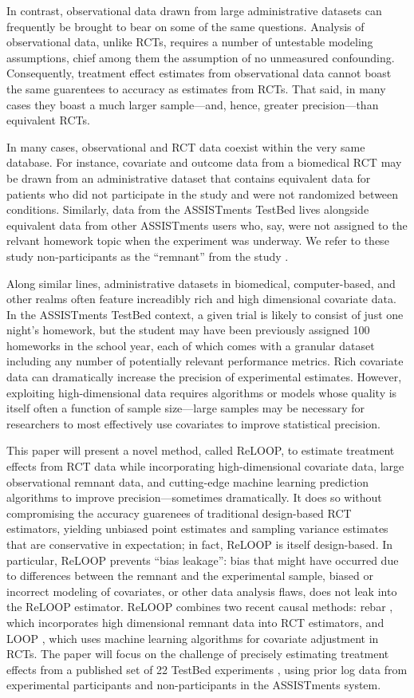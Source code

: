 In contrast, observational data drawn from large administrative
datasets can frequently be brought to bear on some of the same
questions.
Analysis of observational data, unlike RCTs, requires a number of
untestable modeling assumptions, chief among them the assumption of no
unmeasured confounding.
Consequently, treatment effect estimates from observational data
cannot boast the same guarentees to accuracy as estimates from RCTs.
That said, in many cases they boast a much larger sample---and, hence,
greater precision---than equivalent RCTs.

In many cases, observational and RCT data coexist within the very same
database.
For instance, covariate and outcome data from a biomedical RCT may be
drawn from an administrative dataset that contains equivalent data for
patients who did not participate in the study and were not randomized
between conditions.
Similarly, data from the ASSISTments TestBed lives alongside
equivalent data from other ASSISTments users who, say, were not
assigned to the relvant homework topic when the experiment was
underway.
We refer to these study non-participants as the ``remnant'' from the
study \citep[c.f.][]{rebarPaper}.

Along similar lines, administrative datasets in biomedical,
computer-based, and other realms often feature increadibly rich and
high dimensional covariate data.
In the ASSISTments TestBed context, a given
trial is likely to consist of just one night’s homework, but the
student may have been previously assigned 100 homeworks in the school
year, each of which comes with a granular dataset including any number
of potentially relevant performance metrics.
Rich covariate data can dramatically increase the precision of
experimental estimates.
However, exploiting high-dimensional data requires algorithms or
models whose quality is itself often a function of sample size---large
samples may be necessary for researchers to most effectively use
covariates to improve statistical precision.

This paper will present a novel method, called ReLOOP, to estimate
treatment effects
from  RCT data while incorporating high-dimensional covariate data,
large observational remnant data, and cutting-edge machine learning
prediction algorithms to improve precision---sometimes dramatically.
It does so without compromising the accuracy guarenees of traditional
design-based RCT estimators, yielding unbiased point estimates and
sampling variance estimates that are conservative in expectation; in
fact, ReLOOP is itself design-based.
In particular, ReLOOP prevents ``bias leakage'': bias that might have
occurred due to differences between the remnant and the experimental
sample, biased or incorrect modeling of covariates, or other data
analysis flaws, does not leak into the ReLOOP estimator.
ReLOOP combines two recent causal methods: rebar \citep{rebarEDM,jreeTestBed},
which incorporates high dimensional remnant data into RCT estimators,
and LOOP \citep{loop}, which uses machine learning algorithms for
covariate adjustment in RCTs.
The paper will focus on the challenge of precisely estimating
treatment effects from a published set of 22 TestBed experiments \citep{data},
using prior log data from experimental participants and
non-participants in the ASSISTments system.

